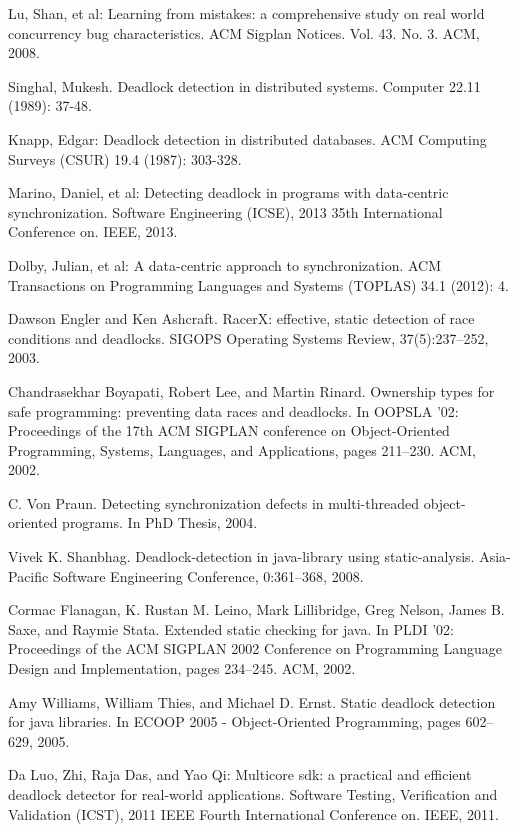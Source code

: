 \begin{thebibliography}{4}

 Lu, Shan, et al: Learning from mistakes: a comprehensive study on real world concurrency bug characteristics.
ACM Sigplan Notices. Vol. 43. No. 3. ACM, 2008.

 Singhal, Mukesh. Deadlock detection in distributed systems.
Computer 22.11 (1989): 37-48.

 Knapp, Edgar: Deadlock detection in distributed databases.
ACM Computing Surveys (CSUR) 19.4 (1987): 303-328.

 Marino, Daniel, et al: Detecting deadlock in programs with data-centric synchronization.
Software Engineering (ICSE), 2013 35th International Conference on. IEEE, 2013.

 Dolby, Julian, et al: A data-centric approach to synchronization.
ACM Transactions on Programming Languages and Systems (TOPLAS) 34.1 (2012): 4.

 Dawson Engler and Ken Ashcraft. RacerX: effective, static detection of race conditions and
deadlocks. SIGOPS Operating Systems Review, 37(5):237–252, 2003.

 Chandrasekhar Boyapati, Robert Lee, and Martin Rinard. Ownership types for safe programming:
preventing data races and deadlocks. In OOPSLA ’02: Proceedings of the 17th
ACM SIGPLAN conference on Object-Oriented Programming, Systems, Languages, and Applications,
pages 211–230. ACM, 2002.

 C. Von Praun. Detecting synchronization defects in multi-threaded object-oriented programs.
In PhD Thesis, 2004.

 Vivek K. Shanbhag. Deadlock-detection in java-library using static-analysis. Asia-Pacific
Software Engineering Conference, 0:361–368, 2008.

 Cormac Flanagan, K. Rustan M. Leino, Mark Lillibridge, Greg Nelson, James B. Saxe, and
Raymie Stata. Extended static checking for java. In PLDI ’02: Proceedings of the ACM
SIGPLAN 2002 Conference on Programming Language Design and Implementation, pages
234–245. ACM, 2002.

 Amy Williams, William Thies, and Michael D. Ernst. Static deadlock detection for java
libraries. In ECOOP 2005 - Object-Oriented Programming, pages 602–629, 2005.

 Da Luo, Zhi, Raja Das, and Yao Qi: Multicore sdk: a practical and efficient deadlock detector for real-world applications.
Software Testing, Verification and Validation (ICST), 2011 IEEE Fourth International Conference on. IEEE, 2011.


\end{thebibliography}
